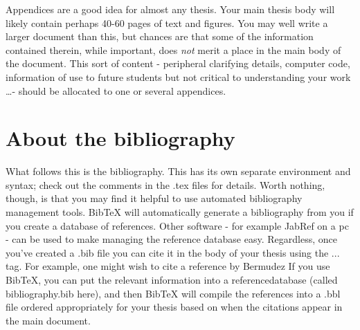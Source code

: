 
Appendices are a good idea for almost any thesis.  Your main thesis body will likely contain perhaps 40-60 pages of text and figures.  You may well write a larger document than this, but chances are that some of the information contained therein, while important, does \emph{not} merit a place in the main body of the document.  This sort of content - peripheral clarifying details, computer code, information of use to future students but not critical to understanding your work \ldots - should be allocated to one or several appendices.  


\section{About the bibliography}
What follows this is the bibliography.  This has its own separate environment and syntax; check out the comments in the .tex files for details.  Worth nothing, though, is that you may find it helpful to use automated bibliography management tools.  BibTeX will automatically generate a bibliography from you if you create a database of references.  Other software - for example JabRef on a pc - can be used to make managing the reference database easy.  Regardless, once you've created a .bib file you can cite it in the body of your thesis using the ... tag.  For example, one might wish to cite a reference by Bermudez  If you use BibTeX, you can put the relevant information into a referencedatabase (called bibliography.bib here), and then BibTeX will compile the references into a .bbl file ordered appropriately for your thesis based on when the citations appear in the main document.